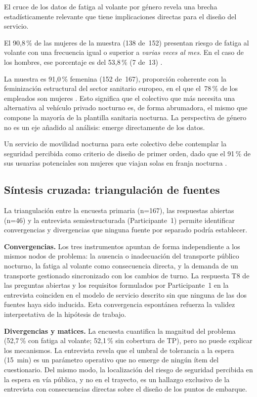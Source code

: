 El cruce de los datos de fatiga al volante por género revela una brecha estadísticamente relevante que tiene implicaciones directas para el diseño del servicio.

El 90{,}8\,\% de las mujeres de la muestra (138 de~152) presentan riesgo de fatiga al volante con una frecuencia igual o superior a \emph{varias veces al mes}. En el caso de los hombres, ese porcentaje es del 53{,}8\,\% (7 de~13) \parencite{LouridoRegueira2026}.

La muestra es 91{,}0\,\% femenina (152 de~167), proporción coherente con la feminización estructural del sector sanitario europeo, en el que el~78\,\% de los empleados son mujeres \parencite{Eurostat2022health}. Esto significa que el colectivo que más necesita una alternativa al vehículo privado nocturno es, de forma abrumadora, el mismo que compone la mayoría de la plantilla sanitaria nocturna. La perspectiva de género no es un eje añadido al análisis: emerge directamente de los datos.

Un servicio de movilidad nocturna para este colectivo debe contemplar la seguridad percibida como criterio de diseño de primer orden, dado que el 91\,\% de sus usuarias potenciales son mujeres que viajan solas en franja nocturna \parencite{LouridoRegueira2026}.

\subsection{Síntesis cruzada: triangulación de fuentes}
\label{sec:triangulacion}

La triangulación entre la encuesta primaria (n=167), las respuestas abiertas (n=46) y la entrevista semiestructurada (Participante~1) permite identificar convergencias y divergencias que ninguna fuente por separado podría establecer.

\textbf{Convergencias.} Los tres instrumentos apuntan de forma independiente a los mismos nodos de problema: la ausencia o inadecuación del transporte público nocturno, la fatiga al volante como consecuencia directa, y la demanda de un transporte gestionado sincronizado con los cambios de turno. La respuesta T8 de las preguntas abiertas y los requisitos formulados por Participante~1 en la entrevista coinciden en el modelo de servicio descrito sin que ninguna de las dos fuentes haya sido inducida. Esta convergencia espontánea refuerza la validez interpretativa de la hipótesis de trabajo.

\textbf{Divergencias y matices.} La encuesta cuantifica la magnitud del problema (52{,}7\,\% con fatiga al volante; 52{,}1\,\% sin cobertura de \acs{TP}), pero no puede explicar los mecanismos. La entrevista revela que el umbral de tolerancia a la espera (15~min) es un parámetro operativo que no emerge de ningún ítem del cuestionario. Del mismo modo, la localización del riesgo de seguridad percibida en la espera en vía pública, y no en el trayecto, es un hallazgo exclusivo de la entrevista con consecuencias directas sobre el diseño de los puntos de embarque.

